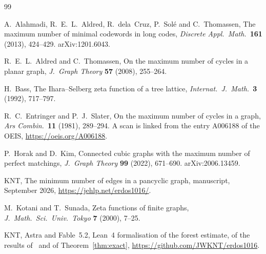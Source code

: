 \documentclass[11pt]{article}
\begin{document}
\begin{thebibliography}{99}\small

 A.~Alahmadi, R.~E.~L.~Aldred, R.~dela~Cruz, P.~Sol\'e and C.~Thomassen, The maximum
number of minimal codewords in long codes, \emph{Discrete Appl.\ Math.}\ \textbf{161} (2013),
424--429. arXiv:1201.6043.

 R.~E.~L.~Aldred and C.~Thomassen, On the maximum number of cycles in a planar graph,
\emph{J.~Graph Theory} \textbf{57} (2008), 255--264.

 H.~Bass, The Ihara--Selberg zeta function of a tree lattice, \emph{Internat.\
J.~Math.}\ \textbf{3} (1992), 717--797.

 R.~C.~Entringer and P.~J.~Slater, On the maximum number of cycles in a graph,
\emph{Ars Combin.}\ \textbf{11} (1981), 289--294. A scan is linked from the entry A006188 of the
OEIS, \url{https://oeis.org/A006188}.

 P.~Horak and D.~Kim, Connected cubic graphs with the maximum number of perfect
matchings, \emph{J.~Graph Theory} \textbf{99} (2022), 671--690. arXiv:2006.13459.

 KNT, The minimum number of edges in a pancyclic graph, manuscript, September 2026,
\url{https://jehlp.net/erdos1016/}.

 M.~Kotani and T.~Sunada, Zeta functions of finite graphs, \emph{J.~Math.\ Sci.\ Univ.\
Tokyo} \textbf{7} (2000), 7--25.

 KNT, Astra and Fable~5.2, Lean~4 formalisation of the forest estimate, of the
results of~\cite{KNT} and of Theorem~\ref{thm:exact}, \url{https://github.com/JWKNT/erdos1016}.

\end{thebibliography}
\end{document}
